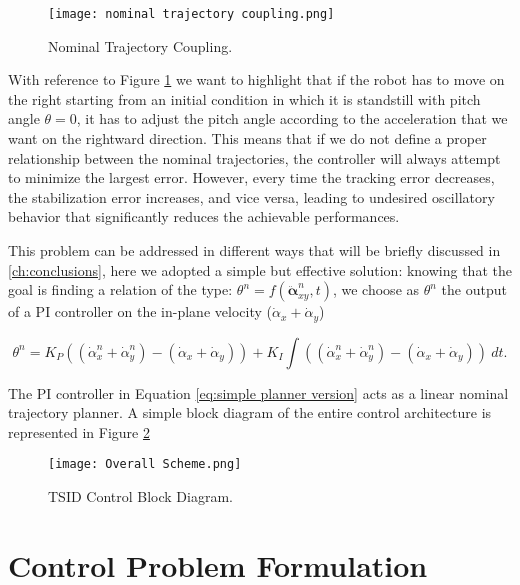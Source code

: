 \begin{figure}
    \centering
    \texttt{[image: nominal trajectory coupling.png]}
    \caption{Nominal Trajectory Coupling.}
    \label{fig:Nominal Trajectory Coupling}
\end{figure}

With reference to Figure \ref{fig:Nominal Trajectory Coupling} we want to highlight that if the robot has to move on the right starting from an initial condition in which it is standstill with pitch angle $\theta =0$, it has to adjust the pitch angle according to the acceleration that we want on the rightward direction.
This means that if we do not define a proper relationship between the nominal trajectories, the controller will always attempt to minimize the largest error. However, every time the tracking error decreases, the stabilization error increases, and vice versa, leading to undesired oscillatory behavior that significantly reduces the achievable performances. 

This problem can be addressed in different ways that will be briefly discussed in \cref{ch:conclusions}, here we adopted a simple but effective solution: knowing that the goal is finding a relation of the type: $\theta^{n} = f (\ddot{\bm{\alpha}}_{xy}^{n}, t)$, we choose as $\theta^{n}$ the output of a PI controller on the in-plane velocity ($\dot{\alpha}_{x} + \dot{\alpha}_{y}$)

\begin{equation}
\theta^{n} =K_P((\dot{\alpha}_{x}^{n}+\dot{\alpha}_{y}^{n}) - (\dot{\alpha}_{x} + \dot{\alpha}_{y})) + K_I \int ((\dot{\alpha}_{x}^{n}+\dot{\alpha}_{y}^{n}) -(\dot{\alpha}_{x} + \dot{\alpha}_{y})) \  dt .
\label{eq:simple planner version}
\end{equation}

The PI controller in Equation \eqref{eq:simple planner version} acts as a linear nominal trajectory planner.
A simple block diagram of the entire control architecture is represented in Figure \ref{fig:TSID Control Block Diagram}

\begin{figure}
    \centering
    \texttt{[image: Overall Scheme.png]}
    \caption{TSID Control Block Diagram.}
    \label{fig:TSID Control Block Diagram}
\end{figure}


\section{Control Problem Formulation}
\label{sec:Control Problem Formulation}

